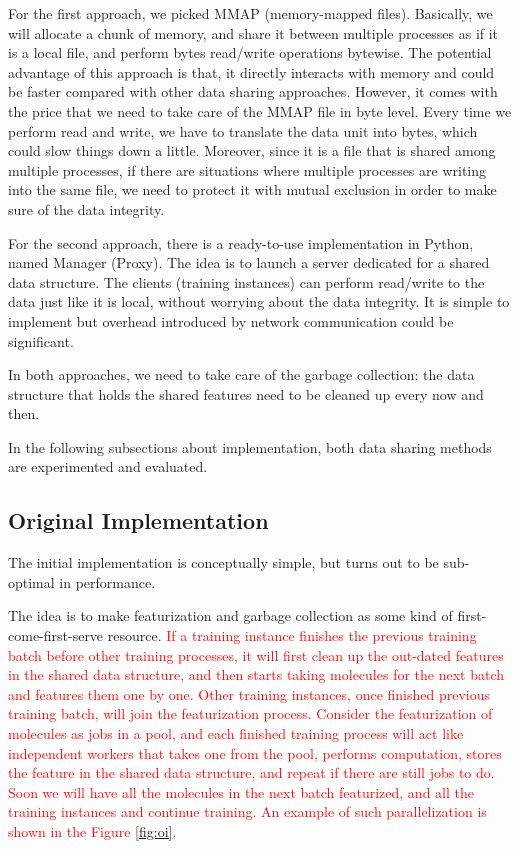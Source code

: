 \documentclass[conference]{IEEEtran}
\begin{document}
For the first approach, we picked MMAP (memory-mapped files). 
Basically, we will allocate a chunk of memory, and share it between multiple processes as if it is a local file, and perform bytes read/write operations bytewise. 
The potential advantage of this approach is that, it directly interacts with memory and could be faster compared with other data sharing approaches. 
However, it comes with the price that we need to take care of the MMAP file in byte level. Every time we perform read and write, we have to translate the data unit into bytes, which could slow things down a little. 
Moreover, since it is a file that is shared among multiple processes, if there are situations where multiple processes are writing into the same file, we need to protect it with mutual exclusion in order to make sure of the data integrity. 

For the second approach, there is a  ready-to-use implementation in Python, named Manager (Proxy). 
The idea is to launch a server dedicated for a shared data structure. 
The clients (training instances) can perform read/write to the data just like it is local, without worrying about the data integrity. 
It is simple to implement but overhead introduced by network communication could be significant. 

In both approaches, we need to take care of the garbage collection: the data structure that holds the shared features need to be cleaned up every now and then.

In the following subsections about implementation, both data sharing methods are experimented and evaluated.


\subsection{Original Implementation} \label{subsec_oi}

The initial implementation is conceptually simple, but turns out to be sub-optimal in performance. 

The idea is to make featurization and garbage collection as some kind of first-come-first-serve resource. 
\textcolor{red}{If a training instance finishes the previous training batch before other training processes, it will first clean up the out-dated features in the shared data structure, and then starts taking molecules for the next batch and features them one by one. 
Other training instances, once finished previous training batch, will join the featurization process.
Consider the featurization of molecules as jobs in a pool, and each finished training process will act like independent workers that takes one from the pool, performs computation, stores the feature in the shared data structure, and repeat if there are still jobs to do.
Soon we will have all the molecules in the next batch featurized, and all the training instances and continue training. 
An example of such parallelization is shown in the Figure \ref{fig:oi}. }
\end{document}
